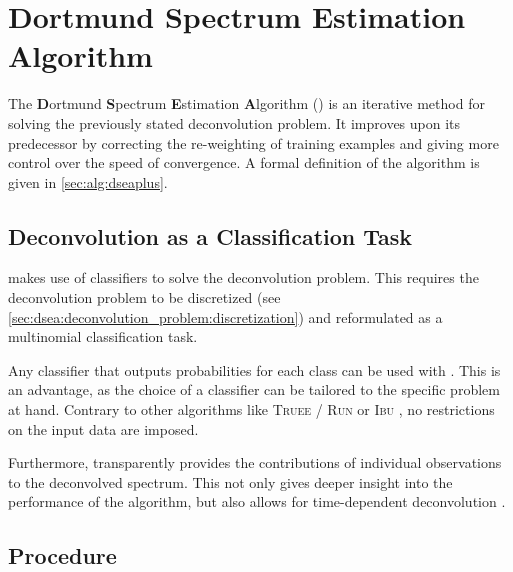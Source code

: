 \section{Dortmund Spectrum Estimation Algorithm} \label{sec:dsea:dsea}
The \textbf{D}ortmund \textbf{S}pectrum \textbf{E}stimation \textbf{A}lgorithm
  (\dsea{})
  \cite{dsea_unification}
is an iterative method for solving the previously stated deconvolution problem.
It improves upon its predecessor \dseanonplus{} \cite{dsea_tim} by
  correcting the re-weighting of training examples and
  giving more control over the speed of convergence.
%
A formal definition of the \dseaplus{} algorithm is given in \autoref{sec:alg:dseaplus}.


\subsection{Deconvolution as a Classification Task} %
\dsea{} makes use of classifiers to solve the deconvolution problem.
This requires the deconvolution problem to be
  discretized (see \autoref{sec:dsea:deconvolution_problem:discretization})
  and reformulated as a multinomial classification task.

Any classifier that outputs probabilities for each class
  can be used with \dsea{}.
This is an advantage,
  as the choice of a classifier can be tailored to the specific problem at hand.
Contrary to other algorithms like
  \textsc{Truee} / \textsc{Run} \cite{milke2013} or
  \textsc{Ibu} \cite{dagostini1995, dagostini2010},
no restrictions on the input data are imposed.

Furthermore,
\dsea{} transparently provides the contributions of individual observations to the deconvolved spectrum.
This not only gives deeper insight into the performance of the algorithm,
but also allows for time-dependent deconvolution \cite{dsea_mirko}. %


\clearpage %
\subsection{Procedure}



